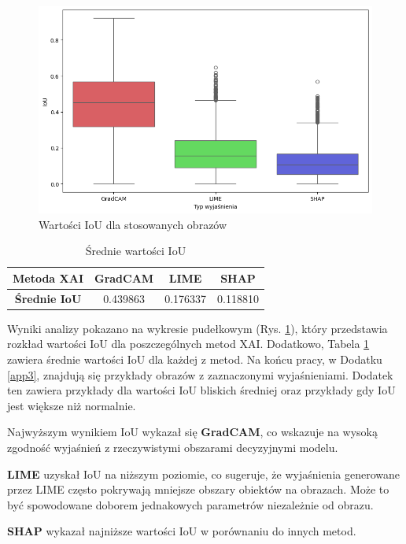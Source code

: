 \begin{figure}[h]
	\centering\includegraphics[width=.9\textwidth]{img/base_iou}
	\caption{Wartości IoU  dla stosowanych obrazów}  \label{rys:basiciou}
\end{figure}

\begin{table}[h]
	\centering
	\begin{tabular}{|c|c|c|c|}
		\hline
		\textbf{Metoda XAI}  & \textbf{GradCAM} & \textbf{LIME} & \textbf{SHAP} \\
		\hline
		\textbf{Średnie IoU} & 0.439863         & 0.176337      & 0.118810      \\
		\hline
	\end{tabular}
	\caption{Średnie wartości IoU}
	\label{tab:basiciou}
\end{table}


Wyniki analizy pokazano na wykresie pudełkowym (Rys. \ref{rys:basiciou}), który przedstawia rozkład wartości IoU dla poszczególnych metod XAI.
Dodatkowo, Tabela \ref{tab:basiciou} zawiera średnie wartości IoU dla każdej z metod.
Na końcu pracy, w Dodatku \ref{app3}, znajdują się przykłady obrazów z zaznaczonymi wyjaśnieniami.
Dodatek ten zawiera przykłady dla wartości IoU bliskich średniej oraz przykłady gdy IoU jest większe niż normalnie.

Najwyższym wynikiem IoU wykazał się \textbf{GradCAM}, co wskazuje na wysoką zgodność wyjaśnień z rzeczywistymi obszarami decyzyjnymi modelu.

\textbf{LIME} uzyskał IoU na niższym poziomie, co sugeruje, że wyjaśnienia generowane przez LIME często pokrywają mniejsze obszary obiektów na obrazach.
Może to być spowodowane doborem jednakowych parametrów niezależnie od obrazu.

\textbf{SHAP} wykazał najniższe wartości IoU w porównaniu do innych metod.

